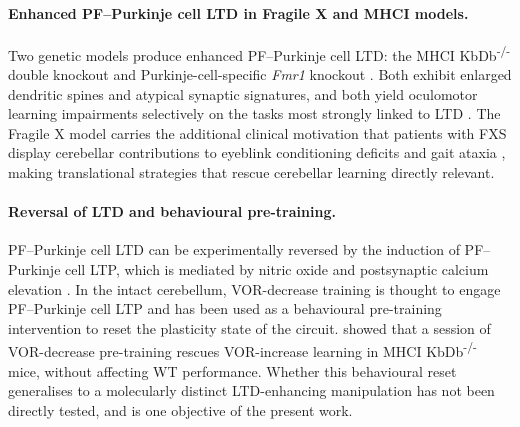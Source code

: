 \documentclass[11pt]{article}
\begin{document}
\paragraph{Enhanced PF--Purkinje cell LTD in Fragile X and MHCI models.}
Two genetic models produce enhanced PF--Purkinje cell LTD: the
MHCI KbDb\textsuperscript{-/-} double knockout and Purkinje-cell-specific
\textit{Fmr1} knockout \citep{koekkoek2005fmr1, nosyreva2006fmr1,
nguyenvu2017saturation}. Both exhibit enlarged dendritic spines and atypical
synaptic signatures, and both yield oculomotor learning impairments
selectively on the tasks most strongly linked to LTD
\citep{nguyenvu2017saturation, koekkoek2005fmr1}. The Fragile X model
carries the additional clinical motivation that patients with FXS display
cerebellar contributions to eyeblink conditioning deficits and gait ataxia
\citep{koekkoek2005fmr1}, making translational strategies that rescue
cerebellar learning directly relevant.

\paragraph{Reversal of LTD and behavioural pre-training.}
PF--Purkinje cell LTD can be experimentally reversed by the induction of
PF--Purkinje cell LTP, which is mediated by nitric oxide and postsynaptic
calcium elevation \citep{levram2003reversing}. In the intact cerebellum,
VOR-decrease training is thought to engage PF--Purkinje cell LTP and has
been used as a behavioural pre-training intervention to reset the plasticity
state of the circuit. \citet{nguyenvu2017saturation} showed that a session
of VOR-decrease pre-training rescues VOR-increase learning in
MHCI KbDb\textsuperscript{-/-} mice, without affecting WT performance.
Whether this behavioural reset generalises to a molecularly distinct
LTD-enhancing manipulation has not been directly tested, and is one
objective of the present work.
\end{document}
